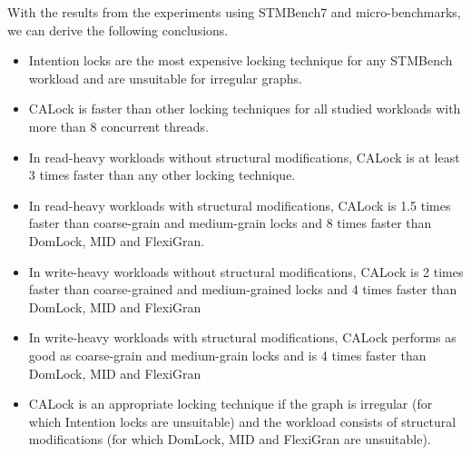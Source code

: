 With the results from the experiments using STMBench7 and micro-benchmarks, we can derive the following conclusions.
\begin{itemize}
	\item Intention locks are the most expensive locking technique for any STMBench workload and are unsuitable for irregular graphs.
	\item CALock is faster than other locking techniques for all studied workloads with more than 8 concurrent threads.

	\item In read-heavy workloads without structural modifications, CALock is at least 3 times faster than any other locking technique.

	\item  In read-heavy workloads with structural modifications, CALock is 1.5 times faster than coarse-grain and medium-grain locks and 8 times faster than DomLock, MID and FlexiGran.

	\item In write-heavy workloads without structural modifications, CALock is 2 times faster than coarse-grained and medium-grained locks and 4 times faster than DomLock, MID and FlexiGran

	\item In write-heavy workloads with structural modifications, CALock performs as good as coarse-grain and medium-grain locks and is 4 times faster than DomLock, MID and FlexiGran

	\item CALock is an appropriate locking technique if the graph is irregular (for which Intention locks are unsuitable) and the workload consists of structural modifications (for which DomLock, MID and FlexiGran are unsuitable).
\end{itemize}

